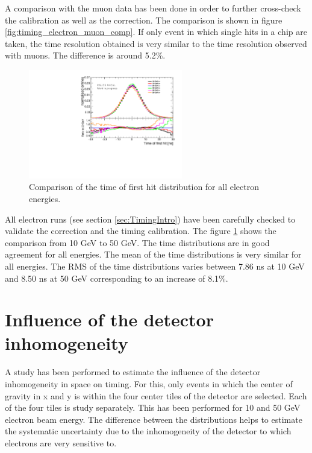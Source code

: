 A comparison with the muon data has been done in order to further cross-check the calibration as well as the correction. The comparison is shown in figure \ref{fig:timing_electron_muon_comp}. If only event in which single hits in a chip are taken, the time resolution obtained is very similar to the time resolution observed with muons. The difference is around 5.2\%.

\begin{figure}[htbp!]
	\centering
	\includegraphics[width=0.6\textwidth]{../Thesis_Plots/Timing/Electrons/Plots/ComparisonDataEnergies.pdf}
	\caption{Comparison of the time of first hit distribution for all electron energies.}
	\label{fig:all_electron_energies}
\end{figure}

All electron runs (see section \ref{sec:TimingIntro}) have been carefully checked to validate the correction and the timing calibration. The figure \ref{fig:all_electron_energies} shows the comparison from 10 GeV to 50 GeV. The time distributions are in good agreement for all energies. The mean of the time distributions is very similar for all energies. The RMS of the time distributions varies between 7.86 ns at 10 GeV and 8.50 ns at 50 GeV corresponding to an increase of 8.1\%.

\section{Influence of the detector inhomogeneity}
\label{subsec:det_inhomo}

A study has been performed to estimate the influence of the detector inhomogeneity in space on timing. For this, only events in which the center of gravity in x and y is within the four center tiles of the detector are selected. Each of the four tiles is study separately. This has been performed for 10 and 50 GeV electron beam energy. The difference between the distributions helps to estimate the systematic uncertainty due to the inhomogeneity of the detector to which electrons are very sensitive to.

